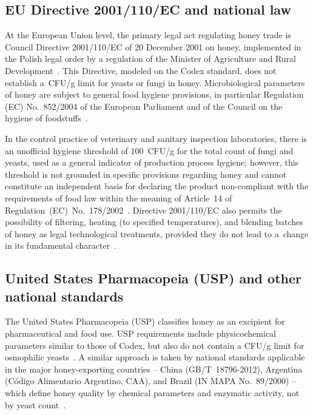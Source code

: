 \subsection{EU Directive 2001/110/EC and national law}

At the European Union level, the primary legal act regulating honey
trade is Council Directive 2001/110/EC of 20 December 2001 on honey,
implemented in the Polish legal order by a regulation of the Minister
of Agriculture and Rural Development~\cite{eudir2001110}.
This Directive, modeled on the Codex standard, does not establish
a~CFU/g limit for yeasts or fungi in honey. Microbiological parameters
of honey are subject to general food hygiene provisions, in particular
Regulation (EC) No.~852/2004 of the European Parliament and of the
Council on the hygiene of foodstuffs~\cite{eudir2001110}.

In the control practice of veterinary and sanitary inspection
laboratories, there is an unofficial hygiene threshold of
$100$~CFU/g for the total count of fungi and yeasts, used as a general
indicator of production process hygiene; however, this threshold is
not grounded in specific provisions regarding honey and cannot
constitute an independent basis for declaring the product
non-compliant with the requirements of food law within the meaning
of Article~14 of Regulation~(EC)~No.~178/2002~\cite{eudir2001110}.
Directive 2001/110/EC also permits the possibility of filtering,
heating (to specified temperatures), and blending batches of honey
as legal technological treatments, provided they do not lead to
a~change in its fundamental character~\cite{eudir2001110}.


\subsection{United States Pharmacopeia (USP) and other national standards}

The United States Pharmacopeia (USP) classifies honey as an excipient
for pharmaceutical and food use. USP requirements include
physicochemical parameters similar to those of Codex, but also do not
contain a CFU/g limit for osmophilic yeasts~\cite{tsagkaris2021}.
A similar approach is taken by national standards applicable in the
major honey-exporting countries -- China (GB/T~18796-2012), Argentina
(Código Alimentario Argentino, CAA), and Brazil (IN MAPA No.~89/2000)
-- which define honey quality by chemical parameters and enzymatic
activity, not by yeast count~\cite{tsagkaris2021}.

